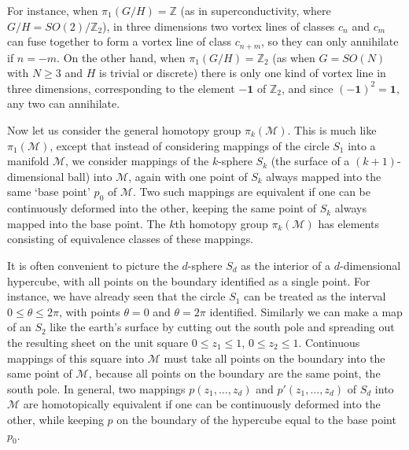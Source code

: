 For instance, when $\pi_1(G/H)=\mathbb Z$ (as in superconductivity, where
$G/H=SO(2)/\mathbb Z_2$), in three dimensions two vortex lines of classes
$c_n$ and $c_m$ can fuse together to form a vortex line of class $c_{n+m}$,
so they can only annihilate if $n=-m$. On the other hand, when
$\pi_1(G/H)=\mathbb Z_2$ (as when $G=SO(N)$ with $N\geq3$ and $H$ is
trivial or discrete) there is only one kind of vortex line in three
dimensions, corresponding to the element $-\mathbf{1}$ of $\mathbb Z_2$,
and since $(-\mathbf{1})^2=\mathbf{1}$, any two can annihilate.

Now let us consider the general homotopy group $\pi_k(\mathcal M)$. This
is much like $\pi_1(\mathcal M)$, except that instead of considering
mappings of the circle $S_1$ into a manifold $\mathcal M$, we consider
mappings of the $k$-sphere $S_k$ (the surface of a $(k+1)$-dimensional
ball) into $\mathcal M$, again with one point of $S_k$ always mapped into
the same `base point' $p_0$ of $\mathcal M$. Two such mappings are
equivalent if one can be continuously deformed into the other, keeping
the same point of $S_k$ always mapped into the base point. The $k$th
homotopy group $\pi_k(\mathcal M)$ has elements consisting of equivalence
classes of these mappings.

It is often convenient to picture the $d$-sphere $S_d$ as the interior of
a $d$-dimensional hypercube, with all points on the boundary identified as
a single point. For instance, we have already seen that the circle $S_1$
can be treated as the interval $0\leq\theta\leq2\pi$, with points
$\theta=0$ and $\theta=2\pi$ identified. Similarly we can make a map of
an $S_2$ like the earth's surface by cutting out the south pole and
spreading out the resulting sheet on the unit square
$0\leq z_1\leq1$, $0\leq z_2\leq1$. Continuous mappings of this square
into $\mathcal M$ must take all points on the boundary into the same point
of $\mathcal M$, because all points on the boundary are the same point,
the south pole. In general, two mappings
$p(z_1,\ldots,z_d)$ and $p'(z_1,\ldots,z_d)$ of $S_d$ into $\mathcal M$
are homotopically equivalent if one can be continuously deformed into the
other, while keeping $p$ on the boundary of the hypercube equal to the
base point $p_0$.

